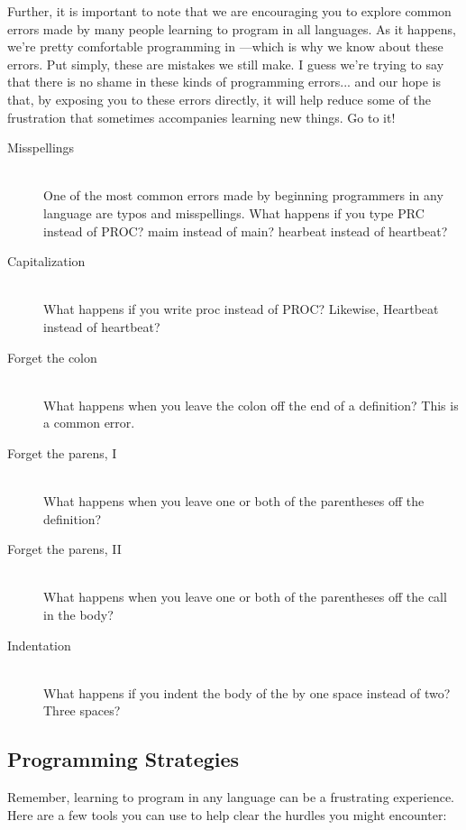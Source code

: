 Further, it is important to note that we are encouraging you to explore common errors made by many people learning to program in all languages. As it happens, we're pretty comfortable programming in \occam---which is why we know about these errors. Put simply, {\strong these are mistakes we still make}. I guess we're trying to say that there is no shame in these kinds of programming errors... and our hope is that, by exposing you to these errors directly, it will help reduce some of the frustration that sometimes accompanies learning new things. Go to it!

\begin{description}
  \item[Misspellings]\ \\ One of the most common errors made by beginning programmers in any language are typos and misspellings. What happens if you type {\code PRC} instead of {\code PROC}? {\code maim} instead of {\code main}? {\code hearbeat} instead of {\code heartbeat}?

	\item[Capitalization]\ \\ What happens if you write {\code proc} instead of {\code PROC}? Likewise, {\code Heartbeat} instead of {\code heartbeat}?

	\item[Forget the colon]\ \\ What happens when you leave the colon off the end of a \PROC definition? This is a  common error.
	
	\item[Forget the parens, I]\ \\ What happens when you leave one or both of the parentheses off the \PROC definition?
	
	\item[Forget the parens, II]\ \\ What happens when you leave one or both of the parentheses off the \PROC call in the body?
	
	\item[Indentation]\ \\ What happens if you indent the body of the \PROC by one space instead of two? Three spaces? 
\end{description}

\subsection{Programming Strategies}
Remember, learning to program in any language can be a frustrating experience. Here are a few tools you can use to help clear the hurdles you might encounter:

